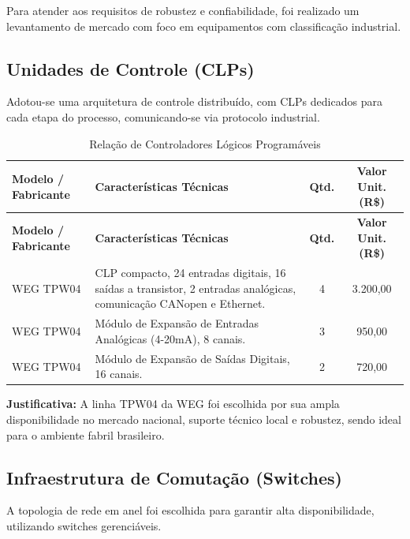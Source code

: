 \documentclass[12pt,a4paper]{article}
\begin{document}
Para atender aos requisitos de robustez e confiabilidade, foi realizado um levantamento de mercado com foco em equipamentos com classificação industrial.

\subsection{Unidades de Controle (CLPs)}
Adotou-se uma arquitetura de controle distribuído, com CLPs dedicados para cada etapa do processo, comunicando-se via protocolo industrial.

\begin{longtable}{@{}p{3.5cm}|p{5cm}|c|c@{}}
\caption{Relação de Controladores Lógicos Programáveis} \\
\toprule
\textbf{Modelo / Fabricante} & \textbf{Características Técnicas} & \textbf{Qtd.} & \textbf{Valor Unit. (R\$)} \\
\midrule
\endfirsthead
\toprule
\textbf{Modelo / Fabricante} & \textbf{Características Técnicas} & \textbf{Qtd.} & \textbf{Valor Unit. (R\$)} \\
\midrule
\endhead
\bottomrule
\endfoot
WEG TPW04 & CLP compacto, 24 entradas digitais, 16 saídas a transistor, 2 entradas analógicas, comunicação CANopen e Ethernet. & 4 & 3.200,00 \\
\midrule
WEG TPW04 & Módulo de Expansão de Entradas Analógicas (4-20mA), 8 canais. & 3 & 950,00 \\
\midrule
WEG TPW04 & Módulo de Expansão de Saídas Digitais, 16 canais. & 2 & 720,00 \\
\bottomrule
\end{longtable}
\textbf{Justificativa:} A linha TPW04 da WEG foi escolhida por sua ampla disponibilidade no mercado nacional, suporte técnico local e robustez, sendo ideal para o ambiente fabril brasileiro.

\subsection{Infraestrutura de Comutação (Switches)}
A topologia de rede em anel foi escolhida para garantir alta disponibilidade, utilizando switches gerenciáveis.
\end{document}
